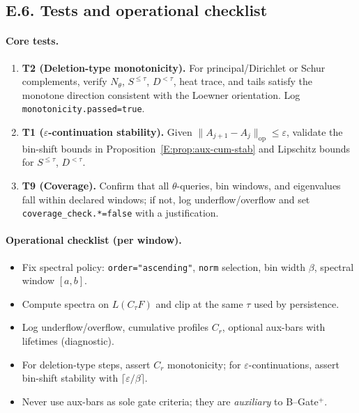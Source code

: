 \documentclass[11pt]{article}
\numberwithin{equation}{section}
\theoremstyle{plain}
\theoremstyle{definition}
\theoremstyle{remark}
\theoremstyle{plain}
\theoremstyle{definition}
\numberwithin{equation}{section}
\theoremstyle{definition}
\numberwithin{equation}{section}
\theoremstyle{plain}
\theoremstyle{definition}
\theoremstyle{remark}
\begin{document}
\subsection*{E.6. Tests and operational checklist}

\paragraph{Core tests.}
\begin{enumerate}[leftmargin=1.25em]
  \item \textbf{T2 (Deletion-type monotonicity).}
  For principal/Dirichlet or Schur complements, verify \(N_\theta\), \(S^{\le\tau}\), \(D^{<\tau}\), heat trace, and tails satisfy the monotone direction consistent with the Loewner orientation. Log \texttt{monotonicity.passed=true}.
  \item \textbf{T1 (\(\varepsilon\)-continuation stability).}
  Given \(\|A_{j+1}-A_j\|_{\mathrm{op}}\le \varepsilon\), validate the bin-shift bounds in Proposition~\ref{E:prop:aux-cum-stab} and Lipschitz bounds for \(S^{\le\tau}\), \(D^{<\tau}\).
  \item \textbf{T9 (Coverage).}
  Confirm that all \(\theta\)-queries, bin windows, and eigenvalues fall within declared windows; if not, log underflow/overflow and set \texttt{coverage\_check.*=false} with a justification.
\end{enumerate}

\paragraph{Operational checklist (per window).}
\begin{itemize}[leftmargin=1.25em]
  \item Fix spectral policy: \texttt{order="ascending"}, \texttt{norm} selection, bin width \(\beta\), spectral window \([a,b]\).
  \item Compute spectra on \(L(C_\tau F)\) and clip at the same \(\tau\) used by persistence.
  \item Log underflow/overflow, cumulative profiles \(C_r\), optional aux-bars with lifetimes (diagnostic).
  \item For deletion-type steps, assert \(C_r\) monotonicity; for \(\varepsilon\)-continuations, assert bin-shift stability with \(\lceil \varepsilon/\beta\rceil\).
  \item Never use aux-bars as sole gate criteria; they are \emph{auxiliary} to B–Gate\(^{+}\).
\end{itemize}
\end{document}
